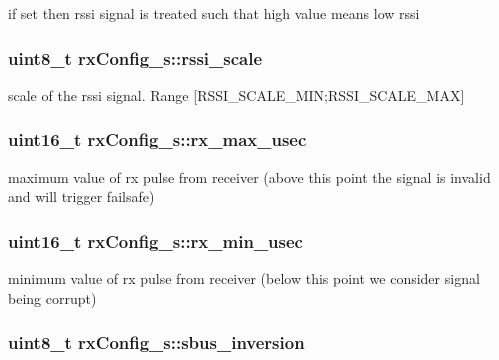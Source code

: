 if set then rssi signal is treated such that high value means low rssi 

\hypertarget{structrxConfig__s_a4fdbbefbcf43fac6691a866f2a662c75}{
\subsubsection[{rssi\+\_\+scale}]{\setlength{\rightskip}{0pt plus 5cm}uint8\+\_\+t rx\+Config\+\_\+s\+::rssi\+\_\+scale}}\label{structrxConfig__s_a4fdbbefbcf43fac6691a866f2a662c75}


scale of the rssi signal. Range \mbox{[}R\+S\+S\+I\+\_\+\+S\+C\+A\+L\+E\+\_\+\+M\+I\+N;R\+S\+S\+I\+\_\+\+S\+C\+A\+L\+E\+\_\+\+M\+A\+X\mbox{]} 

\hypertarget{structrxConfig__s_a37f0f7740a4dbd2a7e5599b54811e36b}{
\subsubsection[{rx\+\_\+max\+\_\+usec}]{\setlength{\rightskip}{0pt plus 5cm}uint16\+\_\+t rx\+Config\+\_\+s\+::rx\+\_\+max\+\_\+usec}}\label{structrxConfig__s_a37f0f7740a4dbd2a7e5599b54811e36b}


maximum value of rx pulse from receiver (above this point the signal is invalid and will trigger failsafe) 

\hypertarget{structrxConfig__s_aec5d9c542b6b13e7780bdc6b51166e4a}{
\subsubsection[{rx\+\_\+min\+\_\+usec}]{\setlength{\rightskip}{0pt plus 5cm}uint16\+\_\+t rx\+Config\+\_\+s\+::rx\+\_\+min\+\_\+usec}}\label{structrxConfig__s_aec5d9c542b6b13e7780bdc6b51166e4a}


minimum value of rx pulse from receiver (below this point we consider signal being corrupt) 

\hypertarget{structrxConfig__s_a9c318cd868cdf79b98c96bb61c181c92}{
\subsubsection[{sbus\+\_\+inversion}]{\setlength{\rightskip}{0pt plus 5cm}uint8\+\_\+t rx\+Config\+\_\+s\+::sbus\+\_\+inversion}}\label{structrxConfig__s_a9c318cd868cdf79b98c96bb61c181c92}


